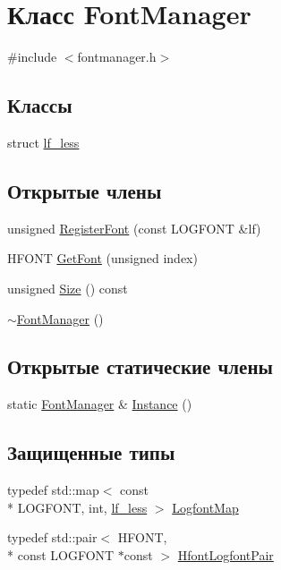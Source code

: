 \hypertarget{class_font_manager}{\section{Класс Font\-Manager}
\label{class_font_manager}
}


{\ttfamily \#include $<$fontmanager.\-h$>$}

\subsection*{Классы}
\begin{DoxyCompactItemize}
\item 
struct \hyperlink{struct_font_manager_1_1lf__less}{lf\-\_\-less}
\end{DoxyCompactItemize}
\subsection*{Открытые члены}
\begin{DoxyCompactItemize}
\item 
unsigned \hyperlink{class_font_manager_a51482f94502a104c3082d8c117fafb1f}{Register\-Font} (const L\-O\-G\-F\-O\-N\-T \&lf)
\item 
H\-F\-O\-N\-T \hyperlink{class_font_manager_a9cbab3da5aed9d27472d67bc3568d278}{Get\-Font} (unsigned index)
\item 
unsigned \hyperlink{class_font_manager_a83c76cdbcc38cd3e27b85642c7ef133d}{Size} () const 
\item 
\hyperlink{class_font_manager_aa190bb023b4cf2ad28e24c69ef57f380}{$\sim$\-Font\-Manager} ()
\end{DoxyCompactItemize}
\subsection*{Открытые статические члены}
\begin{DoxyCompactItemize}
\item 
static \hyperlink{class_font_manager}{Font\-Manager} \& \hyperlink{class_font_manager_a2e6285874d17832e06eb4c66479ec6bf}{Instance} ()
\end{DoxyCompactItemize}
\subsection*{Защищенные типы}
\begin{DoxyCompactItemize}
\item 
typedef std\-::map$<$ const \\*
L\-O\-G\-F\-O\-N\-T, int, \hyperlink{struct_font_manager_1_1lf__less}{lf\-\_\-less} $>$ \hyperlink{class_font_manager_a053e5dac54d91800c691c093e191d17c}{Logfont\-Map}
\item 
typedef std\-::pair$<$ H\-F\-O\-N\-T, \\*
const L\-O\-G\-F\-O\-N\-T $\ast$const  $>$ \hyperlink{class_font_manager_ae5b94ccffd33a60792fc6a2731e48e5f}{Hfont\-Logfont\-Pair}
\end{DoxyCompactItemize}
